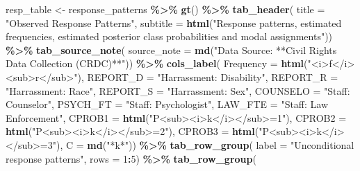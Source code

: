 \documentclass[
]{book}
\newenvironment{Shaded}{\begin{snugshade}}{\end{snugshade}}
\newcommand{\AttributeTok}[1]{\textcolor[rgb]{0.13,0.29,0.53}{#1}}
\newcommand{\DecValTok}[1]{\textcolor[rgb]{0.00,0.00,0.81}{#1}}
\newcommand{\FunctionTok}[1]{\textcolor[rgb]{0.13,0.29,0.53}{\textbf{#1}}}
\newcommand{\NormalTok}[1]{#1}
\newcommand{\OtherTok}[1]{\textcolor[rgb]{0.56,0.35,0.01}{#1}}
\newcommand{\SpecialCharTok}[1]{\textcolor[rgb]{0.81,0.36,0.00}{\textbf{#1}}}
\newcommand{\StringTok}[1]{\textcolor[rgb]{0.31,0.60,0.02}{#1}}
\begin{document}
\begin{Shaded}
\begin{Highlighting}[]
\NormalTok{resp\_table }\OtherTok{\textless{}{-}}\NormalTok{ response\_patterns }\SpecialCharTok{\%\textgreater{}\%} 
  \FunctionTok{gt}\NormalTok{() }\SpecialCharTok{\%\textgreater{}\%}
    \FunctionTok{tab\_header}\NormalTok{(}
    \AttributeTok{title =} \StringTok{"Observed Response Patterns"}\NormalTok{,}
    \AttributeTok{subtitle =} \FunctionTok{html}\NormalTok{(}\StringTok{"Response patterns, estimated frequencies, estimated posterior class probabilities and modal assignments"}\NormalTok{)) }\SpecialCharTok{\%\textgreater{}\%} 
    \FunctionTok{tab\_source\_note}\NormalTok{(}
    \AttributeTok{source\_note =} \FunctionTok{md}\NormalTok{(}\StringTok{"Data Source: **Civil Rights Data Collection (CRDC)**"}\NormalTok{)) }\SpecialCharTok{\%\textgreater{}\%}
    \FunctionTok{cols\_label}\NormalTok{(}
      \AttributeTok{Frequency =} \FunctionTok{html}\NormalTok{(}\StringTok{"\textless{}i\textgreater{}f\textless{}/i\textgreater{}\textless{}sub\textgreater{}r\textless{}/sub\textgreater{}"}\NormalTok{),}
    \AttributeTok{REPORT\_D =} \StringTok{"Harrassment: Disability"}\NormalTok{,}
    \AttributeTok{REPORT\_R =} \StringTok{"Harrassment: Race"}\NormalTok{,}
    \AttributeTok{REPORT\_S =} \StringTok{"Harrassment: Sex"}\NormalTok{,}
    \AttributeTok{COUNSELO =} \StringTok{"Staff: Counselor"}\NormalTok{,}
    \AttributeTok{PSYCH\_FT =} \StringTok{"Staff: Psychologist"}\NormalTok{,}
    \AttributeTok{LAW\_FTE =} \StringTok{"Staff: Law Enforcement"}\NormalTok{,}
    \AttributeTok{CPROB1 =} \FunctionTok{html}\NormalTok{(}\StringTok{"P\textless{}sub\textgreater{}\textless{}i\textgreater{}k\textless{}/i\textgreater{}\textless{}/sub\textgreater{}=1"}\NormalTok{),}
    \AttributeTok{CPROB2 =} \FunctionTok{html}\NormalTok{(}\StringTok{"P\textless{}sub\textgreater{}\textless{}i\textgreater{}k\textless{}/i\textgreater{}\textless{}/sub\textgreater{}=2"}\NormalTok{),}
    \AttributeTok{CPROB3 =} \FunctionTok{html}\NormalTok{(}\StringTok{"P\textless{}sub\textgreater{}\textless{}i\textgreater{}k\textless{}/i\textgreater{}\textless{}/sub\textgreater{}=3"}\NormalTok{),}
    \AttributeTok{C =} \FunctionTok{md}\NormalTok{(}\StringTok{"*k*"}\NormalTok{)) }\SpecialCharTok{\%\textgreater{}\%} 
  \FunctionTok{tab\_row\_group}\NormalTok{(}
    \AttributeTok{label =} \StringTok{"Unconditional response patterns"}\NormalTok{,}
    \AttributeTok{rows =} \DecValTok{1}\SpecialCharTok{:}\DecValTok{5}\NormalTok{) }\SpecialCharTok{\%\textgreater{}\%}
  \FunctionTok{tab\_row\_group}\NormalTok{(}

\end{Highlighting}
\end{Shaded}
\end{document}
